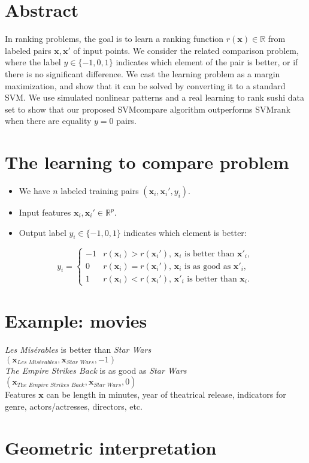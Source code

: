 \documentclass{article}
\newcommand{\RR}{\mathbb R}
\begin{document}
\begin{minipage}{3.5in}
\section*{Abstract}
  In ranking problems, the goal is to learn a ranking function
  $r(\mathbf x)\in\RR$ from labeled pairs $\mathbf x,\mathbf x'$ of
  input points. We consider the related comparison
  problem, where the label $y\in\{-1,0,1\}$ indicates which element of
  the pair is better, or if there is no significant difference. We
  cast the learning problem as a margin maximization, and show that it
  can be solved by converting it to a standard SVM. We use simulated
  nonlinear patterns and a real learning to rank sushi data set to
  show that our proposed SVMcompare algorithm outperforms SVMrank when
  there are equality $y=0$ pairs.

\section*{The learning to compare problem}
\begin{itemize}
\item We have $n$ labeled training pairs $(\mathbf x_i, \mathbf x_i', y_i)$.
\item Input features $\mathbf x_i,\mathbf x_i'\in\RR^p$.
\item Output label $y_i\in\{-1,0,1\}$ indicates which element is better:
\end{itemize}
\begin{equation*}
  \label{eq:z}
  y_i =
  \begin{cases}
    -1 &  r(\mathbf x_i)>r(\mathbf x_i')
    \text{, $\mathbf x_i$ is better than $\mathbf x'_i$},\\
    0 & r(\mathbf x_i) = r(\mathbf x_i')
    \text{, $\mathbf x_i$ is as good as $\mathbf x'_i$},\\
    1 & r(\mathbf x_i)<r(\mathbf x_i')
    \text{, $\mathbf x'_i$ is better than $\mathbf x_i$}.
  \end{cases}
\end{equation*}

\section*{Example: movies}
  \textit{Les Mis\'erables} is better than \textit{Star Wars}\\
  $(\mathbf x_{\textit{Les Mis\'erables}}, \mathbf x_{\textit{Star Wars}}, -1)$\\
  \textit{The Empire Strikes Back} is as good as \textit{Star Wars}\\
  $(\mathbf x_{\textit{The Empire Strikes Back}}, \mathbf x_{\textit{Star Wars}}, 0)$\\
  Features $\mathbf x$ can be length in minutes, year of theatrical
  release, indicators for genre, actors/actresses, directors, etc.

\section*{Geometric interpretation}



  
\end{minipage}
\end{document}
